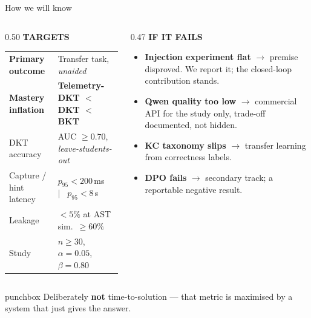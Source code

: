 \documentclass[aspectratio=169,11pt]{beamer}
\newcommand{\punch}[1]{%
  \vfill
  \begin{beamercolorbox}[wd=\textwidth,sep=5pt,rounded=true]{punchbox}
    \centering\small #1
  \end{beamercolorbox}%
}
\newcommand{\co}[1]{\textbf{\color{amber}#1}}
\begin{document}
\begin{frame}{How we will know}
  \vspace{0.4em}
  \begin{columns}[T]
    \begin{column}{0.50\textwidth}
      {\color{accent}\textbf{TARGETS}}\par\vspace{0.2em}
      {\scriptsize
      \begin{tabular}{@{}p{}@{}p{}@{}}
        \textbf{Primary outcome} & Transfer task, \emph{unaided} \\[0.28em]
        \co{Mastery inflation} & \co{Telemetry-DKT $<$ DKT $<$ BKT} \\[0.28em]
        DKT accuracy & AUC $\ge0.70$, \emph{leave-students-out} \\[0.28em]
        Capture / hint latency & $p_{95}<200$\,ms \ $\vert$ \ $p_{95}<8$\,s \\[0.28em]
        Leakage & $<5\%$ at AST sim.\ $\ge60\%$ \\[0.28em]
        Study & $n\ge30$, $\alpha{=}0.05$, $\beta{=}0.80$ \\
      \end{tabular}}
    \end{column}
    \begin{column}{0.47\textwidth}
      {\color{flag}\textbf{IF IT FAILS}}\par\vspace{0.2em}
      {\scriptsize
      \begin{itemize}\setlength{\itemsep}{0.45em}
        \item \textbf{Injection experiment flat} $\to$ premise disproved. We report
              it; the closed-loop contribution stands.
        \item \textbf{Qwen quality too low} $\to$ commercial API for the study only,
              trade-off documented, not hidden.
        \item \textbf{KC taxonomy slips} $\to$ transfer learning from correctness labels.
        \item \textbf{DPO fails} $\to$ secondary track; a reportable negative result.
      \end{itemize}}
    \end{column}
  \end{columns}
  \punch{Deliberately \textbf{not} time-to-solution --- that metric is maximised by a system that just gives the answer.}
\end{frame}
\end{document}
